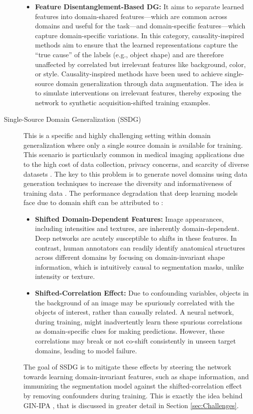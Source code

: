 \begin{description}
\begin{itemize}
        \item \textbf{Feature Disentanglement-Based DG:} It aims to separate learned features into domain-shared features---which are common across domains and useful for the task---and domain-specific features---which capture domain-specific variations. In this category, causality-inspired methods aim to ensure that the learned representations capture the \enquote{true cause} of the labels (e.g., object shape) and are therefore unaffected by correlated but irrelevant features like background, color, or style. Causality-inspired methods have been used to achieve single-source domain generalization through data augmentation. The idea is to simulate interventions on irrelevant features, thereby exposing the network to synthetic acquisition-shifted training examples.
    \end{itemize}
    \item[Single-Source Domain Generalization (SSDG)] This is a specific and highly challenging setting within domain generalization where only a single source domain is available for training. This scenario is particularly common in medical imaging applications due to the high cost of data collection, privacy concerns, and scarcity of diverse datasets \cite{Ouyang2023}. The key to this problem is to generate novel domains using data generation techniques to increase the diversity and informativeness of training data \cite{Wang2023}. The performance degradation that deep learning models face due to domain shift can be attributed to \cite{Ouyang2023}:
    \begin{itemize}
        \item \textbf{Shifted Domain-Dependent Features:} Image appearances, including intensities and textures, are inherently domain-dependent. Deep networks are acutely susceptible to shifts in these features. In contrast, human annotators can readily identify anatomical structures across different domains by focusing on domain-invariant shape information, which is intuitively causal to segmentation masks, unlike intensity or texture.
        \item \textbf{Shifted-Correlation Effect:} Due to confounding variables, objects in the background of an image may be spuriously correlated with the objects of interest, rather than causally related. A neural network, during training, might inadvertently learn these spurious correlations as domain-specific clues for making predictions. However, these correlations may break or not co-shift consistently in unseen target domains, leading to model failure.
    \end{itemize}
The goal of SSDG is to mitigate these effects by steering the network towards learning domain-invariant features, such as shape information, and immunizing the segmentation model against the shifted-correlation effect by removing confounders during training. This is exactly the idea behind GIN-IPA \cite{Ouyang2023}, that is discussed in greater detail in Section \ref{sec:Challenges}.
\end{description}

